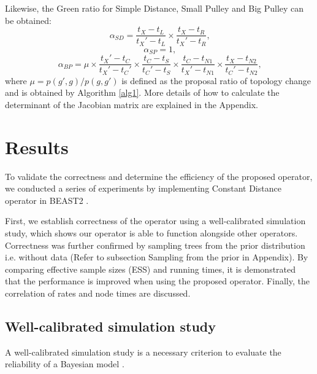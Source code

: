 \documentclass{bmcart}
\begin{document}
Likewise, the Green ratio for Simple Distance, Small Pulley and  Big Pulley can be obtained:
\begin{equation}\label{HR2}
{\alpha_{SD}} = \frac{{{t_X} - {t_L}}}{{{t_X}' - {t_L}}} \times \frac{{{t_X} - {t_R}}}{{{t_X}' - {t_R}}}\text{,}
\end{equation}
\begin{equation}\label{HR3}
{\alpha_{SP}}  = 1\text{,}
\end{equation}
\begin{equation}\label{HR4}
{\alpha_{BP}} = \mu \times \frac{{{t_X}' - {t_C}}}{{{t_X}' - {t_C}'}} \times \frac{{{t_C} - {t_S}}}{{{t_C}' - {t_S}}} \times \frac{{{t_C} - {t_{N1}}}}{{{t_X}' - {t_{N1}}}} \times \frac{{{t_X} - {t_{N2}}}}{{{t_C}' - {t_{N2}}}}\text{,}
\end{equation}
where $\mu = p(g', g) / p(g, g')$ is defined as the proposal ratio of topology change and is obtained by Algorithm \ref{alg1}. More details of how to calculate the determinant of the Jacobian matrix are explained in the Appendix.

\section*{Results}
To validate the correctness and determine the efficiency of the proposed operator, we conducted a series of experiments by implementing Constant Distance operator in BEAST2 \cite{bouckaert2014beast}.

First, we establish correctness of the operator using a well-calibrated simulation study, which shows our operator is able to function alongside other operators. Correctness was further confirmed by sampling trees from the prior distribution i.e. without data (Refer to subsection Sampling from the prior in Appendix). By comparing effective sample sizes (ESS) \cite{Tracer} and running times, it is demonstrated that the performance is improved when using the proposed operator. Finally, the correlation of rates and node times are discussed.

\subsection*{Well-calibrated simulation study}
A well-calibrated simulation study is a necessary criterion to evaluate the reliability of a Bayesian model \cite{dawid1982well}.
\end{document}
